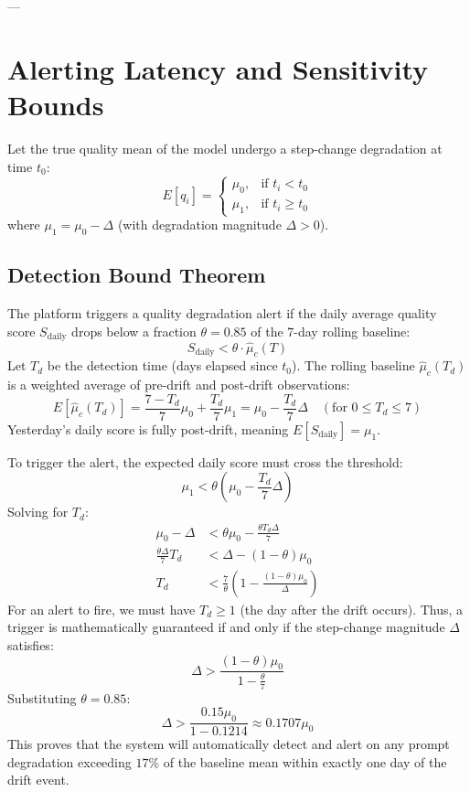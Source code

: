 \documentclass[10pt]{article}
\begin{document}
---

\section{Alerting Latency and Sensitivity Bounds}

Let the true quality mean of the model undergo a step-change degradation at time $t_0$:
\begin{equation}
E[q_i] = \begin{cases} \mu_0, & \text{if } t_i < t_0 \\ \mu_1, & \text{if } t_i \ge t_0 \end{cases}
\end{equation}
where $\mu_1 = \mu_0 - \Delta$ (with degradation magnitude $\Delta > 0$).

\subsection{Detection Bound Theorem}
The platform triggers a quality degradation alert if the daily average quality score $S_{\text{daily}}$ drops below a fraction $\theta = 0.85$ of the 7-day rolling baseline:
\begin{equation}
S_{\text{daily}} < \theta \cdot \hat{\mu}_c(T)
\end{equation}
Let $T_d$ be the detection time (days elapsed since $t_0$). The rolling baseline $\hat{\mu}_c(T_d)$ is a weighted average of pre-drift and post-drift observations:
\begin{equation}
E[\hat{\mu}_c(T_d)] = \frac{7 - T_d}{7} \mu_0 + \frac{T_d}{7} \mu_1 = \mu_0 - \frac{T_d}{7}\Delta \quad (\text{for } 0 \le T_d \le 7)
\end{equation}
Yesterday's daily score is fully post-drift, meaning $E[S_{\text{daily}}] = \mu_1$.

To trigger the alert, the expected daily score must cross the threshold:
\begin{equation}
\mu_1 < \theta \left( \mu_0 - \frac{T_d}{7}\Delta \right)
\end{equation}
Solving for $T_d$:
\begin{align}
\mu_0 - \Delta &< \theta \mu_0 - \frac{\theta T_d \Delta}{7} \\
\frac{\theta \Delta}{7} T_d &< \Delta - (1 - \theta)\mu_0 \\
T_d &< \frac{7}{\theta} \left( 1 - \frac{(1 - \theta)\mu_0}{\Delta} \right)
\end{align}
For an alert to fire, we must have $T_d \ge 1$ (the day after the drift occurs). Thus, a trigger is mathematically guaranteed if and only if the step-change magnitude $\Delta$ satisfies:
\begin{equation}
\Delta > \frac{(1 - \theta)\mu_0}{1 - \frac{\theta}{7}}
\end{equation}
Substituting $\theta = 0.85$:
\begin{equation}
\Delta > \frac{0.15 \mu_0}{1 - 0.1214} \approx 0.1707 \mu_0
\end{equation}
This proves that the system will automatically detect and alert on any prompt degradation exceeding $17\%$ of the baseline mean within exactly one day of the drift event.
\end{document}
